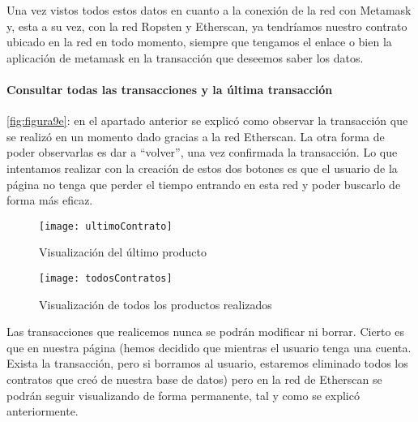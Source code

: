 Una vez vistos todos estos datos en cuanto a la conexión de la red con Metamask y, esta a su vez, con la red Ropsten y Etherscan, ya tendríamos nuestro contrato ubicado en la red en todo momento, siempre que tengamos el enlace o bien la aplicación de metamask en la transacción que deseemos saber los datos.

\paragraph{Consultar todas las transacciones y la última transacción} \ref{fig:figura9e}: en el apartado anterior se explicó como observar la transacción que se realizó en un momento dado gracias a la red Etherscan. La otra forma de poder observarlas es dar a ``volver'', una vez confirmada la transacción. Lo que intentamos realizar con la creación de estos dos botones es que el usuario de la página no tenga que perder el tiempo entrando en esta red y poder buscarlo de forma más eficaz.

\begin{figure}[h!]
	\centering
	\begin{minipage}{0.8\linewidth}
		\centering
    	\texttt{[image: ultimoContrato]}
    	\caption{Visualización del último producto}
    	\label{fig:figura9e}
	\end{minipage}
	\begin{minipage}{0.8\linewidth}
		 \centering
    	\texttt{[image: todosContratos]}
    	\caption{Visualización de todos los productos realizados}
    	\label{fig:figura10e}
	\end{minipage}
\end{figure}

Las transacciones que realicemos nunca se podrán modificar ni borrar. Cierto es que en nuestra página (hemos decidido que mientras el usuario tenga una cuenta. Exista la transacción, pero si borramos al usuario, estaremos eliminado todos los contratos que creó de nuestra base de datos) pero en la red de Etherscan se podrán seguir visualizando de forma permanente, tal y como se explicó anteriormente. 
